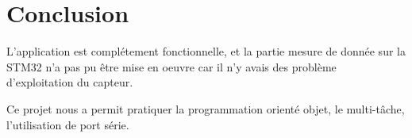 \chapter{Conclusion}

L'application est complétement fonctionnelle, et la partie mesure de donnée sur la STM32 n'a pas pu être mise en oeuvre car il n'y avais des problème d'exploitation du capteur.
\newline
\newline

Ce projet nous a permit pratiquer la programmation orienté objet, le multi-tâche, l'utilisation de port série.